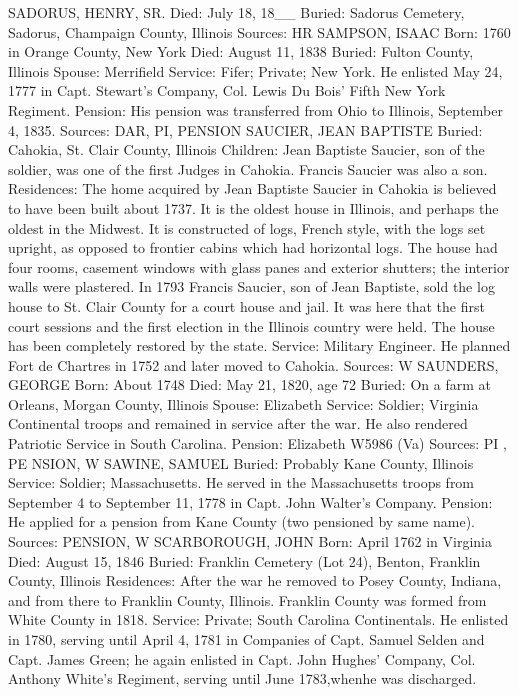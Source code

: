SADORUS, HENRY, SR.
Died: July 18, 18__ 
Buried: Sadorus Cemetery, Sadorus, Champaign County, Illinois 
Sources: HR 
SAMPSON, ISAAC 
Born: 1760 in Orange County, New York 
Died: August 11, 1838 
Buried: Fulton County, Illinois 
Spouse: Merrifield 
Service: Fifer; Private; New York. He enlisted May 24, 1777 in Capt. Stewart's Company, Col. Lewis Du Bois' Fifth New York Regiment. 
Pension: His pension was transferred from Ohio to Illinois, September 4, 1835. 
Sources: DAR, PI, PENSION 
SAUCIER, JEAN BAPTISTE 
Buried: Cahokia, St. Clair County, Illinois 
Children: Jean Baptiste Saucier, son of the soldier, was one of the first Judges in Cahokia. Francis Saucier was also a son. 
Residences: The home acquired by Jean Baptiste Saucier in Cahokia is believed to have been built about 1737. It is the oldest house in Illinois, and perhaps the oldest in the Midwest. It is constructed of logs, French style, with the logs set upright, as opposed to frontier cabins which had horizontal logs. The house had four rooms, casement windows with glass panes and exterior shutters; the interior walls were plastered. In 1793 Francis Saucier, son of Jean Baptiste, sold the log house to St. Clair County for a court house and jail. It was here that the first court sessions and the first election in the Illinois country were held. The house has been completely restored by the state. 
Service: Military Engineer. He planned Fort de Chartres in 1752 and later moved to Cahokia. 
Sources: W 
SAUNDERS, GEORGE 
Born: About 1748 
Died: May 21, 1820, age 72 
Buried: On a farm at Orleans, Morgan County, Illinois 
Spouse: Elizabeth
Service: Soldier; Virginia Continental troops and remained in service after the war. He also rendered Patriotic Service in South Carolina.
Pension: Elizabeth W5986 (Va)
Sources: PI , PE NSION, W 
SAWINE, SAMUEL 
Buried: Probably Kane County, Illinois
Service:  Soldier; Massachusetts. He served in the Massachusetts troops from September 4 to September 11, 1778 in Capt. John Walter's Company.
Pension: He applied for a pension from Kane County (two pensioned by same name). 
Sources: PENSION, W 
SCARBOROUGH, JOHN 
Born: April 1762 in Virginia 
Died: August 15, 1846 
Buried: Franklin Cemetery (Lot 24), Benton, Franklin County, Illinois 
Residences: After the war he removed to Posey County, Indiana, and from there to Franklin County, Illinois. Franklin County was formed from White County in 1818. 
Service: Private; South Carolina Continentals. He enlisted in 1780, serving until April 4, 1781 in Companies of Capt. Samuel Selden and Capt. James Green; he again enlisted in Capt. John Hughes' Company, Col. Anthony White's Regiment, serving until June 1783,whenhe was discharged. 
